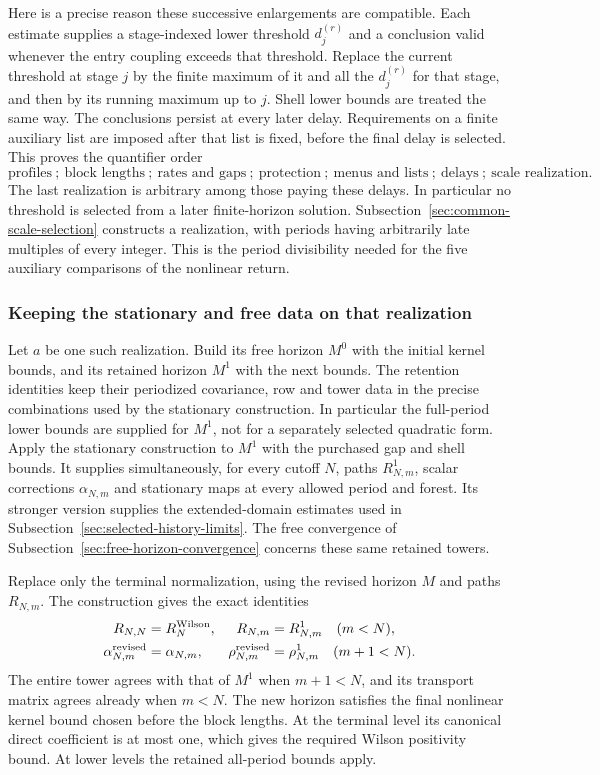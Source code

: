 Here is a precise reason these successive enlargements are compatible.
Each estimate supplies a stage-indexed lower threshold $d^{(r)}_j$
and a conclusion valid whenever the entry coupling exceeds that
threshold. Replace the current threshold at stage $j$ by the finite
maximum of it and all the $d^{(r)}_j$ for that stage, and then by its
running maximum up to $j$. Shell lower bounds are treated the same
way. The conclusions persist at every later delay. Requirements on a
finite auxiliary list are imposed after that list is fixed, before the
final delay is selected. This proves the quantifier order
\[
 \text{profiles}\ ;\ \text{block lengths}\ ;\ \text{rates and gaps}\ ;\
 \text{protection}\ ;\ \text{menus and lists}\ ;\ \text{delays}\ ;\
 \text{scale realization}.
\]
The last realization is arbitrary among those paying these delays.
In particular no threshold is selected from a later finite-horizon
solution. Subsection~\ref{sec:common-scale-selection} constructs a
realization, with periods having arbitrarily late multiples of every
integer. This is the period divisibility needed for the five auxiliary
comparisons of the nonlinear return.

\subsubsection{Keeping the stationary and free data on that realization}
Let $a$ be one such realization. Build its free horizon $M^0$ with the
initial kernel bounds, and its retained horizon $M^1$ with the next
bounds. The retention identities keep their periodized covariance,
row and tower data in the precise combinations used by the stationary
construction. In particular the full-period lower bounds are supplied
for $M^1$, not for a separately selected quadratic form.
Apply the stationary construction to $M^1$ with the purchased gap and
shell bounds. It supplies simultaneously, for every cutoff $N$,
paths $R^1_{N,m}$, scalar corrections $\alpha_{N,m}$ and stationary
maps at every allowed period and forest. Its stronger version supplies
the extended-domain estimates used in
Subsection~\ref{sec:selected-history-limits}. The free convergence
of Subsection~\ref{sec:free-horizon-convergence} concerns these same
retained towers.

Replace only the terminal normalization, using the revised horizon
$M$ and paths $R_{N,m}$. The construction gives the exact identities
\begin{align*}
 R_{N,N}&=R^{\rm Wilson}_N,&
 R_{N,m}&=R^1_{N,m}\quad(m<N),\\
 \alpha^{\rm revised}_{N,m}&=\alpha_{N,m},&
 \rho^{\rm revised}_{N,m}&=\rho^1_{N,m}\quad(m+1<N).
\end{align*}
The entire tower agrees with that of $M^1$ when $m+1<N$, and its
transport matrix agrees already when $m<N$. The new horizon satisfies
the final nonlinear kernel bound chosen before the block lengths.
At the terminal level its canonical direct coefficient is at most
one, which gives the required Wilson positivity bound. At lower levels
the retained all-period bounds apply.

